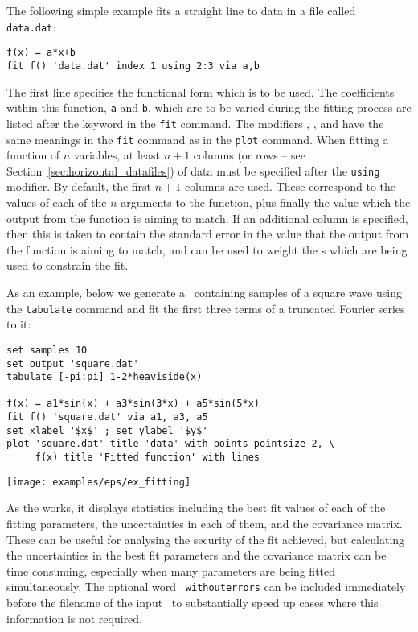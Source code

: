 The following simple example fits a straight line to data in a file called {\tt
data.dat}:

\begin{verbatim}
f(x) = a*x+b
fit f() 'data.dat' index 1 using 2:3 via a,b
\end{verbatim}

\noindent The first line specifies the functional form which is to be used.
The coefficients within this function, {\tt a} and {\tt b}, which are to be
varied during the fitting process are listed after the keyword 
in the {\tt fit} command.  The modifiers , ,
 and  have the same meanings in the {\tt fit}
command as in the {\tt plot} command. When fitting a function of $n$
variables, at least $n+1$ columns (or rows -- see
Section~\ref{sec:horizontal_datafiles}) of data must be specified after the {\tt using}
modifier. By default, the first $n+1$ columns are used. These correspond to the
values of each of the $n$ arguments to the function, plus finally the value which
the output from the function is aiming to match.  If an additional column is
specified, then this is taken to contain the standard error in the value that
the output from the function is aiming to match, and can be used to weight the
\datapoint s which are being used to constrain the fit.

As an example, below we generate a \datafile\ containing samples of a square
wave using the {\tt tabulate} command and fit the first three terms of a
truncated Fourier series to it:

\begin{verbatim}
set samples 10
set output 'square.dat'
tabulate [-pi:pi] 1-2*heaviside(x)

f(x) = a1*sin(x) + a3*sin(3*x) + a5*sin(5*x)
fit f() 'square.dat' via a1, a3, a5
set xlabel '$x$' ; set ylabel '$y$'
plot 'square.dat' title 'data' with points pointsize 2, \
     f(x) title 'Fitted function' with lines
\end{verbatim}

\begin{center}
\texttt{[image: examples/eps/ex\_fitting]}
\end{center}

As the  works, it displays statistics including the best fit
values of each of the fitting parameters, the uncertainties in each of them,
and the covariance matrix. These can be useful for analysing the security of
the fit achieved, but calculating the uncertainties in the best fit parameters
and the covariance matrix can be time consuming, especially when many
parameters are being fitted simultaneously. The optional word {\tt
withouterrors} can be included immediately before the filename of the input
\datafile\ to substantially speed up cases where this information is not
required.


